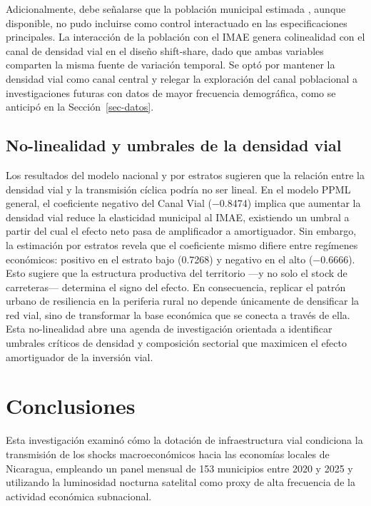 \documentclass[
  spanish,
  12pt,
  letterpaper]{article}
\begin{document}
Adicionalmente, debe señalarse que la población municipal estimada
\parencite{worldpop2020}, aunque disponible, no pudo incluirse como
control interactuado en las especificaciones principales. La interacción
de la población con el IMAE genera colinealidad con el canal de densidad
vial en el diseño shift-share, dado que ambas variables comparten la
misma fuente de variación temporal. Se optó por mantener la densidad
vial como canal central y relegar la exploración del canal poblacional a
investigaciones futuras con datos de mayor frecuencia demográfica, como
se anticipó en la Sección~\ref{sec-datos}.

\subsection{No-linealidad y umbrales de la densidad
vial}\label{no-linealidad-y-umbrales-de-la-densidad-vial}

Los resultados del modelo nacional y por estratos sugieren que la
relación entre la densidad vial y la transmisión cíclica podría no ser
lineal. En el modelo PPML general, el coeficiente negativo del Canal
Vial (−0.8474) implica que aumentar la densidad vial reduce la
elasticidad municipal al IMAE, existiendo un umbral a partir del cual el
efecto neto pasa de amplificador a amortiguador. Sin embargo, la
estimación por estratos revela que el coeficiente mismo difiere entre
regímenes económicos: positivo en el estrato bajo (0.7268) y negativo en
el alto (−0.6666). Esto sugiere que la estructura productiva del
territorio ---y no solo el stock de carreteras--- determina el signo del
efecto. En consecuencia, replicar el patrón urbano de resiliencia en la
periferia rural no depende únicamente de densificar la red vial, sino de
transformar la base económica que se conecta a través de ella. Esta
no-linealidad abre una agenda de investigación orientada a identificar
umbrales críticos de densidad y composición sectorial que maximicen el
efecto amortiguador de la inversión vial.

\section{Conclusiones}\label{sec-conclusiones}

Esta investigación examinó cómo la dotación de infraestructura vial
condiciona la transmisión de los shocks macroeconómicos hacia las
economías locales de Nicaragua, empleando un panel mensual de 153
municipios entre 2020 y 2025 y utilizando la luminosidad nocturna
satelital como proxy de alta frecuencia de la actividad económica
subnacional.
\end{document}
